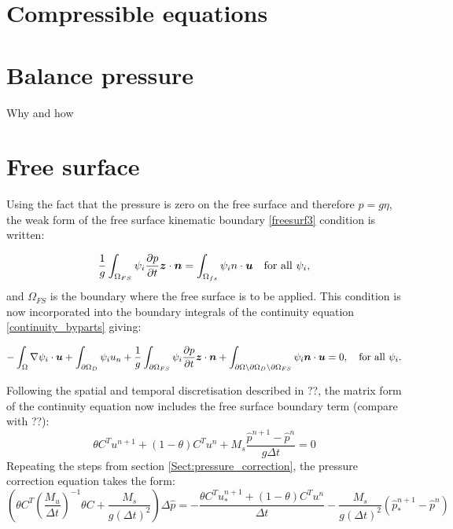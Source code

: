 \section{Compressible equations}

\section{Balance pressure}
\label{Sect:balance_pressure}
Why and how

\section{Free surface}

Using the fact that the pressure is zero on the free surface and therefore $p=g\eta$, the weak form of the free surface kinematic boundary \eqref{freesurf3} condition is written:

\begin{equation}\label{weakfreesurf3}
\frac{1}{g} \int_{\Omega_{FS}} {\psi_i }\frac{\partial p}{\partial t}{\mbox{\boldmath$z$}} \cdot {\mbox{\boldmath$n$}}=\int_{\Omega_{fs}} \psi_i {n \cdot {\mbox{\boldmath$u$}}} \quad
  \text{for all } \psi_i,
\end{equation}
and $\Omega_{FS}$ is the boundary where the free surface is to be applied. This condition is now incorporated into the boundary integrals of the continuity equation \eqref{continuity_byparts} giving:

\begin{equation}\label{continuity_byparts_withfs}
  -\int_\Omega \nabla\psi_i \cdot {\mbox{\boldmath$u$}}
  + \int_{\partial\Omega_D} \psi_i u_n
  + \frac{1}{g} \int_{\partial\Omega_{FS}}  {\psi_i }\frac{\partial p}{\partial t}{\mbox{\boldmath$z$}} \cdot {\mbox{\boldmath$n$}}
  + \int_{\partial\Omega\setminus\partial\Omega_D\setminus\partial\Omega_{FS}} \psi_i{\mbox{\boldmath$n$}}\cdot {\mbox{\boldmath$u$}}
  = 0,\quad
  \text{for all } \psi_i.
\end{equation}

Following the spatial and temporal discretisation described in ??, the matrix form of the continuity equation now includes the free surface boundary term (compare with ??):
\begin{equation}
\theta C^T u^{n+1} + (1-\theta) C^T u^n + M_s \frac{\hat p^{n+1}-\hat p^n}{g \Delta t}=0
\end{equation}
Repeating the steps from section \ref{Sect:pressure_correction}, the pressure correction equation takes the form:
\begin{equation}
(\theta C^T(\frac{M_u}{\Delta t})^{-1} \theta C + \frac{M_s}{g(\Delta t)^2})\Delta \hat p = -\frac{\theta C^T u_*^{n+1} + (1-\theta)C^Tu^n}{\Delta t}-\frac{M_s}{g(\Delta t)^2}(\hat p_*^{n+1}-\hat p^n)
\end{equation}


